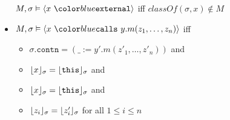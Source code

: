\begin{definition}
\begin{itemize}
$\satisfiesA{M}{\sigma}{\external{x}}$ iff 
$\textit{classOf}(\sigma,x) \not\in M$
\item
$\satisfiesA{M}{\sigma}{\calls{x}{y}{m}{z_1, \ldots, z_n}}$ iff
\begin{itemize}
\item
$\sigma.\texttt{contn} = (\_ := y'.m(z'_1,\ldots,z'_n))$ and 
\item
$\lfloor x \rfloor_{\sigma} = \lfloor {\texttt{this}} \rfloor_{\sigma}$ and
\item
$\lfloor x \rfloor_{\sigma} = \lfloor {\texttt{this}} \rfloor_{\sigma}$ and
\item
$\lfloor z_i \rfloor_{\sigma} = \lfloor z'_i \rfloor_{\sigma}$ for all $1 \leq i \leq n$
\end{itemize}
\end{itemize}
\end{definition}

	
